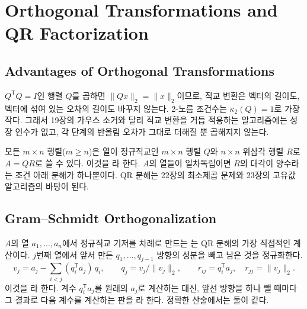 \chapter{Orthogonal Transformations and QR Factorization}
\label{ch:qr}


\section{Advantages of Orthogonal Transformations}
\label{sec:orthogonal}

$Q^{\mathsf T}Q=I$인 행렬 $Q$를 곱하면 $\|Qx\|_2=\|x\|_2$이므로, 직교 변환은 벡터의 길이도, 벡터에 섞여 있는 오차의 길이도 바꾸지 않는다. 2-노름 조건수는 $\kappa_2(Q)=1$로 가장 작다. 그래서 19장의 가우스 소거와 달리 직교 변환을 거듭 적용하는 알고리즘에는 성장 인수가 없고, 각 단계의 반올림 오차가 그대로 더해질 뿐 곱해지지 않는다.

모든 $m\times n$ 행렬($m\ge n$)은 열이 정규직교인 $m\times n$ 행렬 $Q$와 $n\times n$ 위삼각 행렬 $R$로 $A=QR$로 쓸 수 있다. 이것을 라 한다. $A$의 열들이 일차독립이면 $R$의 대각이 양수라는 조건 아래 분해가 하나뿐이다. QR 분해는 22장의 최소제곱 문제와 23장의 고유값 알고리즘의 바탕이 된다.

\section{Gram--Schmidt Orthogonalization}
\label{sec:gram-schmidt}

$A$의 열 $a_1,\dots,a_n$에서 정규직교 기저를 차례로 만드는 는 QR 분해의 가장 직접적인 계산이다. $j$번째 열에서 앞서 만든 $q_1,\dots,q_{j-1}$ 방향의 성분을 빼고 남은 것을 정규화한다.
\[
v_j=a_j-\sum_{i<j}(q_i^{\mathsf T}a_j)\,q_i,\qquad q_j=v_j/\|v_j\|_2,\qquad r_{ij}=q_i^{\mathsf T}a_j,\quad r_{jj}=\|v_j\|_2.
\]
이것을 라 한다. 계수 $q_i^{\mathsf T}a_j$를 원래의 $a_j$로 계산하는 대신, 앞선 방향을 하나 뺄 때마다 그 결과로 다음 계수를 계산하는 판을 라 한다. 정확한 산술에서는 둘이 같다.

